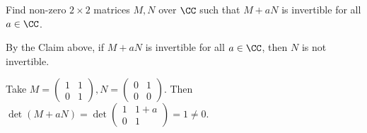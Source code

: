 \documentclass[11pt]{scrartcl}
\begin{document}
\begin{linenumbers}
  \begin{problem*}
    Find non-zero $2\times 2$ matrices $M, N$ over $\CC$ such that
    $M+aN$ is invertible for all $a\in\CC$.
  \end{problem*}

  \begin{soln}
    By the Claim above, if $M+aN$ is invertible for all $a\in \CC$,
    then $N$ is not invertible.

    Take $
    M =
    \begin{pmatrix}
      1 & 1\\
      0 & 1
    \end{pmatrix}, N =
    \begin{pmatrix}
      0 & 1\\
      0 & 0
    \end{pmatrix}$. Then $\det(M+aN) = \det
    \begin{pmatrix}
      1 & 1 + a \\
      0 & 1
    \end{pmatrix} = 1 \neq 0. $
  \end{soln}

\end{linenumbers}
\end{document}

